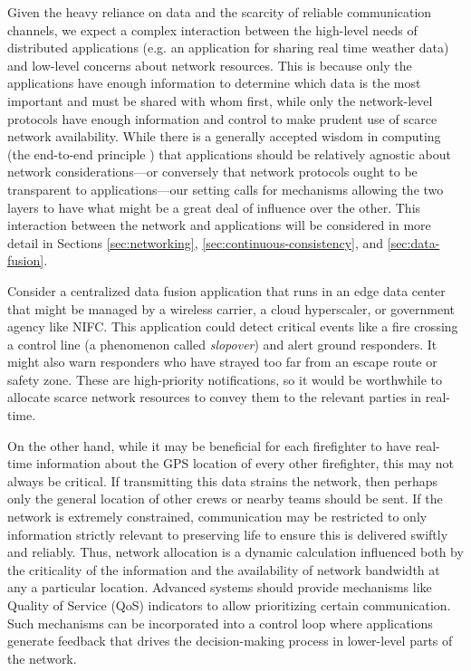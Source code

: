 \documentclass[]             %
{NASA}                       %
\theoremstyle{definition}
\begin{document}
Given the heavy reliance on data and the scarcity of reliable
communication channels, we expect a complex interaction between the
high-level needs of distributed applications (e.g. an application for
sharing real time weather data) and low-level concerns about network
resources. This is because only the applications have enough
information to determine which data is the most important and must be
shared with whom first, while only the network-level protocols have
enough information and control to make prudent use of scarce network
availability. While there is a generally accepted wisdom in computing
(the end-to-end principle \citationneeded) that applications should be
relatively agnostic about network considerations---or conversely that
network protocols ought to be transparent to applications---our
setting calls for mechanisms allowing the two layers to have what
might be a great deal of influence over the other. This interaction
between the network and applications will be considered in more detail
in Sections \ref{sec:networking}, \ref{sec:continuous-consistency},
and \ref{sec:data-fusion}.

Consider a centralized data fusion application that runs in an edge
data center \citationneeded that might be managed by a wireless
carrier, a cloud hyperscaler, or government agency like NIFC. This
application could detect critical events like a fire crossing a
control line (a phenomenon called \emph{slopover}) and alert ground
responders. It might also warn responders who have strayed too far
from an escape route or safety zone. These are high-priority
notifications, so it would be worthwhile to allocate scarce network
resources to convey them to the relevant parties in real-time.

On the other hand, while it may be beneficial for each firefighter to
have real-time information about the GPS location of every other
firefighter, this may not always be critical. If transmitting this
data strains the network, then perhaps only the general location of
other crews or nearby teams should be sent. If the network is
extremely constrained, communication may be restricted to only
information strictly relevant to preserving life to ensure this is
delivered swiftly and reliably. Thus, network allocation is a dynamic
calculation influenced both by the criticality of the information and
the availability of network bandwidth at any a particular
location. Advanced systems should provide mechanisms like Quality of
Service (QoS) indicators to allow prioritizing certain
communication. Such mechanisms can be incorporated into a control loop
where applications generate feedback that drives the decision-making
process in lower-level parts of the network.
\end{document}
